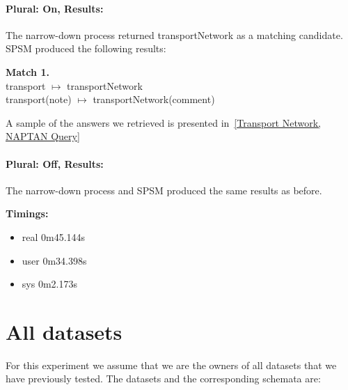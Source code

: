 \documentclass[a4paper,10pt]{article}
\begin{document}
\paragraph{Plural: On, Results:}
The narrow-down process returned transportNetwork as a matching candidate. SPSM produced the following results:

\textbf{Match 1.}\\
transport $\mapsto$ transportNetwork\\
transport(note) $\mapsto$ transportNetwork(comment)

A sample of the answers we retrieved is presented in~\ref{Transport Network, NAPTAN Query}

\paragraph{Plural: Off, Results:} The narrow-down process and SPSM produced the same results as before.

\textbf{Timings:}
\begin{itemize}
\item real	0m45.144s
\item user	0m34.398s
\item sys	0m2.173s

\end{itemize}




\section{All datasets}
For this experiment we assume that we are the owners of all datasets that we have previously tested. The datasets and the corresponding schemata are:
\end{document}

